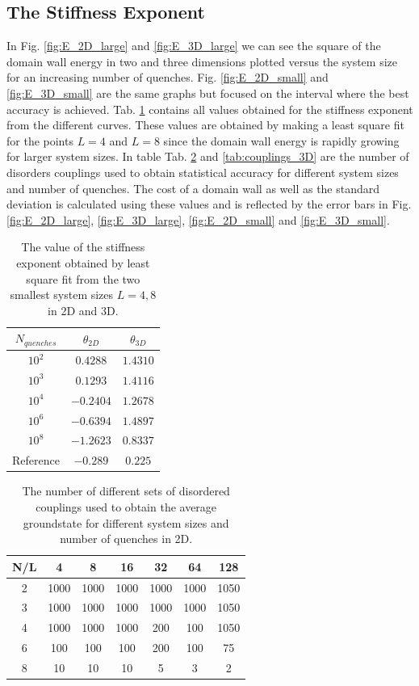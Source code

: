 \documentclass[paper=a4, fontsize=11pt]{scrartcl} %
\numberwithin{equation}{section} %
\numberwithin{figure}{section} %
\numberwithin{table}{section} %
\begin{document}
\subsection{The Stiffness Exponent}
In Fig. \ref{fig:E_2D_large} and \ref{fig:E_3D_large} we can see the square of the domain wall energy in two and three dimensions plotted versus the system size for an increasing number of quenches. Fig. \ref{fig:E_2D_small} and \ref{fig:E_3D_small} are the same graphs but focused on the interval where the best accuracy is achieved. Tab. \ref{tab:stiffness_exponent} contains all values obtained for the stiffness exponent from the different curves. These values are obtained by making a least square fit for the points $L=4$ and $L=8$ since the domain wall energy is rapidly growing for larger system sizes. In table Tab. \ref{tab:couplings_2D} and \ref{tab:couplings_3D} are the number of disorders couplings used to obtain statistical accuracy for different system sizes and number of quenches. The cost of a domain wall as well as the standard deviation is calculated using these values and is reflected by the error bars in Fig. \ref{fig:E_2D_large}, \ref{fig:E_3D_large}, \ref{fig:E_2D_small} and \ref{fig:E_3D_small}.

\begin{table}[h]
\centering
  \begin{tabular}{| c | c | c |}
    \hline
    $N_{quenches}$ & $\theta_{2D}$ & $\theta_{3D}$ \\ \hline
    $10^2$ & $0.4288$ & $1.4310$ \\ \hline
    $10^3$ & $0.1293$ & $1.4116$ \\ \hline
    $10^4$ & $-0.2404$ & $1.2678$ \\ \hline
    $10^6$ & $-0.6394$ & $1.4897$ \\ \hline
    $10^8$ & $-1.2623$ & $0.8337$ \\ \hline
    Reference & $-0.289$ & $0.225$ \\ \hline
  \end{tabular}
  \caption{The value of the stiffness exponent obtained by least square fit from the two smallest system sizes $L=4,8$ in 2D and 3D.}
  \label{tab:stiffness_exponent}
\end{table}

\begin{table}[h]
\centering
  \begin{tabular}{| c | c | c | c | c | c | c |}
    \hline
    N/L & 4 & 8 & 16 & 32 & 64 & 128 \\ \hline
	2 & 1000 & 1000 & 1000 & 1000 & 1000 & 1050 \\ \hline
	3 & 1000 & 1000 & 1000 & 1000 & 1000 & 1050 \\ \hline
	4 & 1000 & 1000 & 1000 & 200 & 100 & 1050 \\ \hline
	6 & 100 & 100 & 100 & 200 & 100 & 75 \\ \hline
	8 & 10 & 10 & 10 & 5 & 3 & 2 \\ \hline
  \end{tabular}
  \caption{The number of different sets of disordered couplings used to obtain the average groundstate for different system sizes and number of quenches in 2D.}
  \label{tab:couplings_2D}
\end{table}
\end{document}
